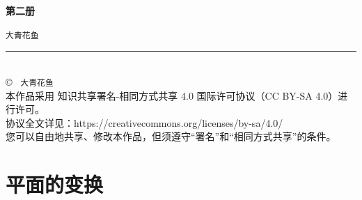 \documentclass[12pt,UTF8,fontset=none]{ctexbook}
\newcommand{\mytitle}{第二册}
\newcommand{\myauthor}{大青花鱼}
\begin{document}
\cleardoublepage                %
\thispagestyle{empty}           %
\begin{center}
    \vspace*{2cm}               %
    
    { \bfseries \mytitle}
    
    \vspace{1cm}              %
    
    { \texttt{\myauthor}}
    
    \vfill                      %
    
    \rule{0.5\textwidth}{0.4pt} \\[0.5cm]
    
    {\scriptsize
    \copyright\ \the\year{} \texttt{\myauthor} \\[0.2cm]
    本作品采用 知识共享署名-相同方式共享 4.0 国际许可协议（CC BY-SA 4.0）进行许可。\\
    协议全文详见：https://creativecommons.org/licenses/by-sa/4.0/ \\
    您可以自由地共享、修改本作品，但须遵守“署名”和“相同方式共享”的条件。
    }
\end{center}
\newpage   
\tableofcontents
\newpage

\chapter{平面的变换}






\end{document}
